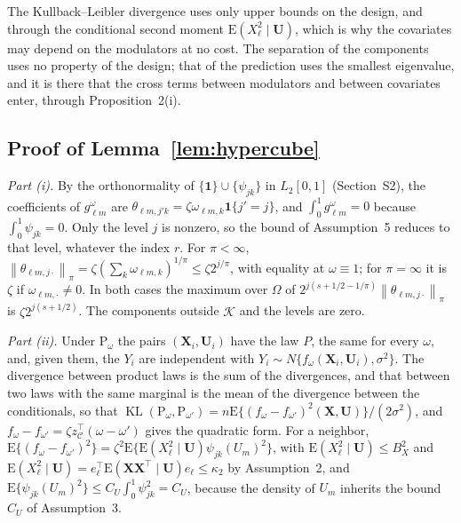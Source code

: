 \documentclass[10pt]{book}
\theoremstyle{definition}
\newcommand{\E}{\mathrm{E}}
\newcommand{\Prob}{\mathrm{P}}
\newcommand{\T}{^{\top}}
\newcommand{\norm}[1]{\left\lVert #1 \right\rVert}
\newcommand{\cv}{\ell}
\newcommand{\md}{m}
\newcommand{\lev}{j}
\newcommand{\tsl}{k}
\newcommand{\bX}{\mathbf{X}}
\newcommand{\bU}{\mathbf{U}}
\newcommand{\gcomp}[2]{g_{#1#2}}
\newcommand{\wav}[2]{\psi_{#1#2}}
\newcommand{\Kcal}{\mathcal{K}}
\begin{document}
{The Kullback--Leibler divergence uses only upper bounds on the design, and
through the conditional second moment $\E(X_{\cv}^{2}\mid\bU)$, which is why
the covariates may depend on the modulators at no cost. The separation of the
components uses no property of the design; that of the prediction uses the
smallest eigenvalue, and it is there that the cross terms between modulators
and between covariates enter, through Proposition~2(i).

\subsection*{Proof of Lemma~\ref{lem:hypercube}}

\emph{Part (i).} By the orthonormality of $\{\mathbf{1}\}\cup\{\wav{\lev}{\tsl}\}$
in $L_2[0,1]$ (Section~S2), the coefficients of $\gcomp{\cv}{\md}^{\omega}$
are $\theta_{\cv\md,\lev'\tsl} = \zeta\omega_{\cv\md,\tsl}\mathbf{1}\{\lev' =
\lev\}$, and $\int_0^1\gcomp{\cv}{\md}^{\omega} = 0$ because
$\int_0^1\wav{\lev}{\tsl} = 0$. Only the level $\lev$ is nonzero, so the bound
of Assumption~5 reduces to that level, whatever the index $r$. For
$\pi < \infty$, $\norm{\theta_{\cv\md,\lev\cdot}}_{\pi} =
\zeta(\sum_{\tsl}\omega_{\cv\md,\tsl})^{1/\pi} \le \zeta2^{\lev/\pi}$, with
equality at $\omega \equiv 1$; for $\pi = \infty$ it is $\zeta$ if
$\omega_{\cv\md,\cdot} \ne 0$. In both cases the maximum over $\Omega$ of
$2^{\lev(s+1/2-1/\pi)}\norm{\theta_{\cv\md,\lev\cdot}}_{\pi}$ is
$\zeta2^{\lev(s+1/2)}$. The components outside $\Kcal$ and the levels are
zero.

\emph{Part (ii).} Under $\Prob_{\omega}$ the pairs $(\bX_i,\bU_i)$ have the
law $P$, the same for every $\omega$, and, given them, the $Y_i$ are
independent with $Y_i \sim N\{f_{\omega}(\bX_i,\bU_i),\sigma^{2}\}$. The
divergence between product laws is the sum of the divergences, and that
between two laws with the same marginal is the mean of the divergence between
the conditionals, so that
$\operatorname{KL}(\Prob_{\omega},\Prob_{\omega'}) =
n\E\{(f_{\omega}-f_{\omega'})^{2}(\bX,\bU)\}/(2\sigma^{2})$, and
$f_{\omega}-f_{\omega'} = \zeta z_{\mathcal{C}}\T(\omega-\omega')$ gives the
quadratic form. For a neighbor, $\E\{(f_{\omega}-f_{\omega'})^{2}\} =
\zeta^{2}\E\{\E(X_{\cv}^{2}\mid\bU)\wav{\lev}{\tsl}(U_{\md})^{2}\}$, with
$\E(X_{\cv}^{2}\mid\bU) \le B_X^{2}$ and $\E(X_{\cv}^{2}\mid\bU) =
e_{\cv}\T\E(\bX\bX\T\mid\bU)e_{\cv} \le \kappa_2$ by Assumption~2, and
$\E\{\wav{\lev}{\tsl}(U_{\md})^{2}\} \le C_U\int_0^1\wav{\lev}{\tsl}^{2} = C_U$,
because the density of $U_{\md}$ inherits the bound $C_U$ of Assumption~3.

}
\end{document}
